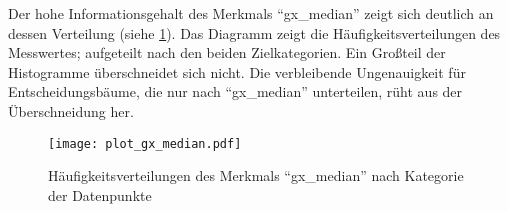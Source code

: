 Der hohe Informationsgehalt des Merkmals \enquote{gx\_median} zeigt sich deutlich an dessen Verteilung (siehe \cref{fig:histogramm_gx_median}). Das Diagramm zeigt die Häufigkeitsverteilungen des Messwertes; aufgeteilt nach den beiden Zielkategorien. Ein Großteil der Histogramme überschneidet sich nicht. Die verbleibende Ungenauigkeit für Entscheidungsbäume, die nur nach \enquote{gx\_median} unterteilen, rüht aus der Überschneidung her. 

\begin{figure}[ht]
	\centering
	\texttt{[image: plot\_gx\_median.pdf]}
	\caption{Häufigkeitsverteilungen des Merkmals \enquote{gx\_median} nach Kategorie der Datenpunkte}
	\label{fig:histogramm_gx_median}
\end{figure}
